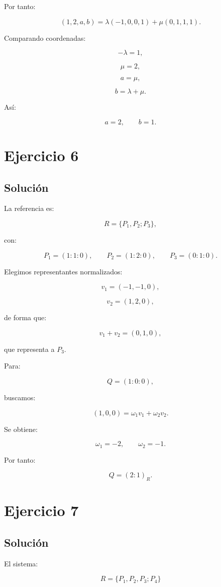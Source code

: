 \documentclass[11pt,a4paper]{article}
\begin{document}
Por tanto:

\[
(1,2,a,b)
=
\lambda(-1,0,0,1)
+
\mu(0,1,1,1).
\]

Comparando coordenadas:

\[
-\lambda=1,
\]

\[
\mu=2,
\]

\[
a=\mu,
\]

\[
b=\lambda+\mu.
\]

Así:

\[
\boxed{
a=2,
\qquad
b=1.
}
\]

\section{Ejercicio 6}
\subsection{Solución}

La referencia es:

\[
R=\{P_1,P_2;P_3\},
\]

con:

\[
P_1=(1:1:0),
\qquad
P_2=(1:2:0),
\qquad
P_3=(0:1:0).
\]

Elegimos representantes normalizados:

\[
v_1=(-1,-1,0),
\]

\[
v_2=(1,2,0),
\]

de forma que:

\[
v_1+v_2=(0,1,0),
\]

que representa a \(P_3\).

Para:

\[
Q=(1:0:0),
\]

buscamos:

\[
(1,0,0)
=
\omega_1v_1+\omega_2v_2.
\]

Se obtiene:

\[
\omega_1=-2,
\qquad
\omega_2=-1.
\]

Por tanto:

\[
\boxed{
Q=(2:1)_R.
}
\]

\section{Ejercicio 7}
\subsection{Solución}

El sistema:

\[
R=\{P_1,P_2,P_3;P_4\}
\]
\end{document}
